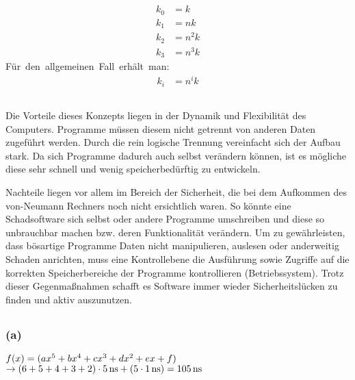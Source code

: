 \documentclass[11pt,a4paper]{article}
\begin{document}
\subsection{} %
\begin{align}
k_{0} &= k\\
k_{1} &= nk\\
k_{2} &= n^{2}k\\
k_{3} &= n^{3}k
\end{align}
\mbox{Für den allgemeinen Fall erhält man:}
\begin{align}
k_{i} &= n^{i}k
\end{align}


\subsection{} %
Die Vorteile dieses Konzepts liegen in der Dynamik und Flexibilität des Computers. Programme müssen diesem nicht getrennt von anderen Daten zugeführt werden. Durch die rein logische Trennung vereinfacht sich der Aufbau stark. Da sich Programme dadurch auch selbst verändern können, ist es mögliche diese sehr schnell und wenig speicherbedürftig zu entwickeln.

Nachteile liegen vor allem im Bereich der Sicherheit, die bei dem Aufkommen des von-Neumann Rechners noch nicht ersichtlich waren. So könnte eine Schadsoftware sich selbst oder andere Programme umschreiben und diese so unbrauchbar machen bzw. deren Funktionalität verändern. Um zu gewährleisten, dass bösartige Programme Daten nicht manipulieren, auslesen oder anderweitig Schaden anrichten, muss eine Kontrollebene die Ausführung sowie Zugriffe auf die korrekten Speicherbereiche der Programme kontrollieren (Betriebssystem). Trotz dieser Gegenmaßnahmen schafft es Software immer wieder Sicherheitslücken zu finden und aktiv auszunutzen.


\subsection{} %

\subsubsection{(a)} %

$f(x) = (ax^{5} + bx^{4} + cx^{3} + dx^{2} + ex + f)\\$
$\rightarrow (6 + 5 + 4 + 3 + 2) \cdot \unit[5]{ns} + (5 \cdot \unit[1]{ns}) = \unit[105]{ns}\\$
\end{document}
